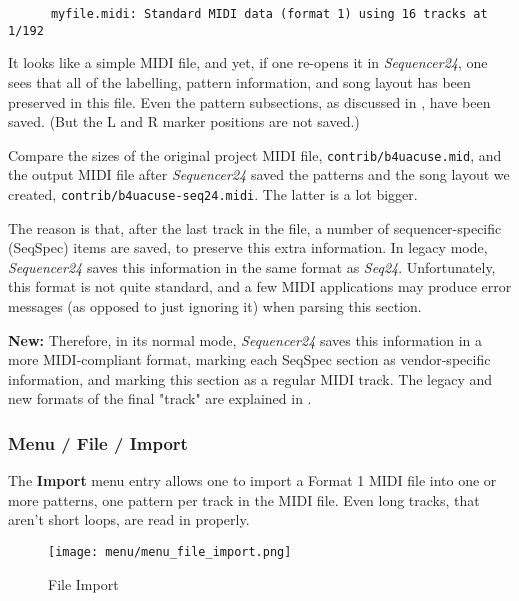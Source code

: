    \begin{verbatim}
      myfile.midi: Standard MIDI data (format 1) using 16 tracks at 1/192
   \end{verbatim}

   It looks like a simple MIDI file, and yet, if one re-opens it in
   \textsl{Sequencer24}, one sees that all of the labelling, pattern information,
   and song layout has been preserved in this file.
   Even the pattern subsections, as discussed in
   ,
   have been saved.
   (But the L and R marker positions are not saved.)

   Compare the sizes of the original project MIDI file,
   \texttt{contrib/b4uacuse.mid}, and the output MIDI file after
   \textsl{Sequencer24} saved the patterns and the song layout we created,
   \texttt{contrib/b4uacuse-seq24.midi}.  The latter is a lot
   bigger.

   The reason is that, after the last track in the file, a number of
   sequencer-specific (SeqSpec) items are saved, to preserve this extra
   information.  In legacy mode, \textsl{Sequencer24} saves this information
   in the same format as \textsl{Seq24}.  Unfortunately, this format is
   not quite standard, and a few MIDI applications may produce error
   messages (as opposed to just ignoring it) when parsing this section. 
   
   \textbf{New:}
   Therefore, in its normal mode, \textsl{Sequencer24} saves this
   information in a more MIDI-compliant format, marking each SeqSpec section
   as vendor-specific information, and marking this section as a regular
   MIDI track.
   The legacy and new formats of the final "track" are explained in
   .

\subsubsection{Menu / File / Import}
\label{subsubsec:seq24_menu_file_import}

   The \textbf{Import} menu entry allows one to import a Format 1 MIDI file
   into one or more patterns, one pattern per track in the MIDI file.
   Even long tracks, that aren't short loops, are read in properly.

\begin{figure}[H]
   \centering 
   \texttt{[image: menu/menu\_file\_import.png]}
   \caption{File Import}
   \label{fig:seq24_menu_file_import}
\end{figure}

